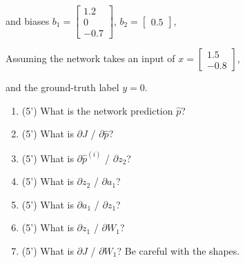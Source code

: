 \documentclass[11pt]{article}\pagestyle{plain}
\begin{document}
and biases
$
b_1=
\begin{bmatrix}
	1.2\\
	0\\
	-0.7
\end{bmatrix}
$,
$
b_2=
\begin{bmatrix}
	0.5
\end{bmatrix}
$, 

Assuming the network takes an input of 
$
x=
\begin{bmatrix}
	1.5\\
	-0.8
\end{bmatrix}
$, 

and the ground-truth label $y=0$.

\begin{enumerate}
	\item (5') What is the network prediction $\hat{p}$?
	\item (5') What is ${\partial J}$ / ${\partial \hat{p}}$?
	\item (5') What is ${\partial \hat{p}^{(i)}}$ / ${\partial z_2}$?
	\item (5') What is ${\partial z_2}$ / ${\partial a_1}$?
	\item (5') What is ${\partial a_1}$ / ${\partial z_1}$?
	\item (5') What is ${\partial z_1}$ / ${\partial W_1}$?
	\item (5') What is ${\partial J}$ / ${\partial W_1}$? Be careful with the shapes. 
\end{enumerate}
\end{document}
